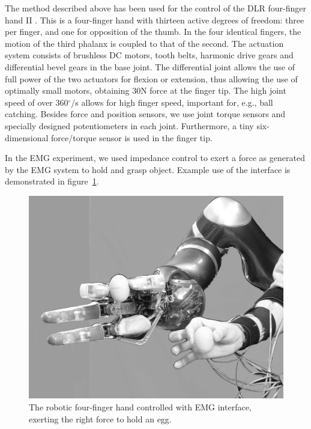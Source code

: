 The method described above has been used for the control of the DLR
four-finger hand II \cite{ButFisGre2004}.  This is a four-finger hand
with thirteen active degrees of freedom: three per finger, and one for
opposition of the thumb.  In the four identical fingers, the motion of
the third phalanx is coupled to that of the second.  The actuation
system consists of brushless DC motors, tooth belts, harmonic drive
gears and differential bevel gears in the base joint.  The
differential joint allows the use of full power of the two actuators
for flexion or extension, thus allowing the use of optimally small
motors, obtaining 30N force at the finger tip.  The high joint speed
of over 360$^\circ$/s allows for high finger speed, important for,
e.g., ball catching.  Besides force and position sensors, we use joint
torque sensors and specially designed potentiometers in each joint.
Furthermore, a tiny six-dimensional force/torque sensor is used in the
finger tip.

In the EMG experiment, we used impedance control to exert a force as
generated by the EMG system to hold and grasp object.  Example use of
the interface is demonstrated in figure~\ref{fig:egg-hand}.

\begin{figure}
  \includegraphics[width=\columnwidth]{figs/egg-in-hand.jpg}
  \caption{The robotic four-finger hand controlled with EMG interface, exerting the right force to hold an egg.}
  \label{fig:egg-hand}
\end{figure}
